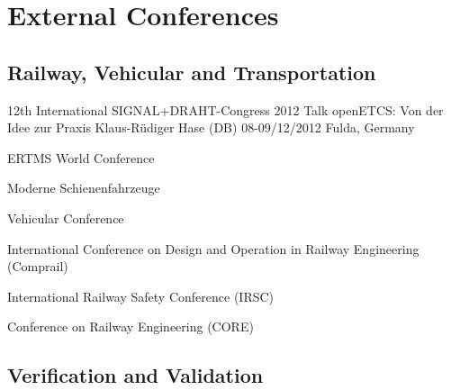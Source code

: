 ﻿\section{External Conferences}


\subsection{Railway, Vehicular and Transportation}


\begin{activity}{12th International SIGNAL+DRAHT-Congress 2012}
		{Talk}
		{openETCS: Von der Idee zur Praxis}
		{Klaus-Rüdiger Hase (DB)}
			{08-09/12/2012}
		{Fulda, Germany}
\end{activity}


\begin{activity}{ERTMS World Conference}

\end{activity}


\begin{activity}{Moderne Schienenfahrzeuge}
\end{activity}

\begin{activity}{Vehicular Conference}

\end{activity}

\begin{activity}{International Conference on Design and Operation in Railway Engineering (Comprail)}

\end{activity}

\begin{activity}{International Railway Safety Conference (IRSC)}

\end{activity}

\begin{activity}{Conference on Railway Engineering (CORE)}
\end{activity}


\subsection{Verification and Validation}

